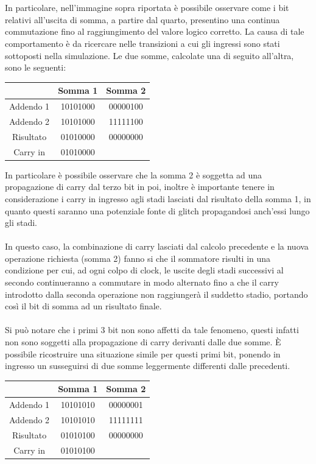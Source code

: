 \documentclass[11pt,  english, makeidx, a4paper, titlepage, oneside]{book}
\begin{document}
\\\\
In particolare, nell'immagine sopra riportata è possibile osservare come i bit relativi all'uscita di somma, a partire dal
quarto, presentino una continua commutazione fino al raggiungimento del valore logico corretto. La causa di tale comportamento è da ricercare
nelle transizioni a cui gli ingressi sono stati sottoposti nella simulazione. Le due somme, calcolate una di seguito all'altra,
sono le seguenti:
\vspace{0.3cm}
\begin{center}
\begin{tabular}{|c|c|c|}
\hline
& Somma 1 & Somma 2 \\
\hline
Addendo 1 & 10101000 & 00000100\\
\hline
Addendo 2 & 10101000 & 11111100\\
\hline
Risultato & 01010000 & 00000000\\
\hline
Carry in & 01010000 & \\
\hline
\end{tabular}
\end{center}
\vspace{0.3cm}
In particolare è possibile osservare che la somma 2 è soggetta ad una propagazione di carry dal terzo bit in poi, inoltre è importante tenere
in considerazione i carry in ingresso agli stadi lasciati dal risultato della somma 1, in quanto questi saranno una potenziale fonte di glitch propagandosi anch'essi lungo gli stadi. \\\\
In questo caso, la combinazione di carry lasciati dal calcolo precedente e la nuova operazione richiesta (somma 2) fanno si che il sommatore risulti in una condizione per cui, ad ogni colpo di clock, le uscite degli stadi successivi al secondo continueranno a commutare in modo alternato fino a che il carry introdotto dalla seconda operazione non raggiungerà il suddetto stadio, portando così
il bit di somma ad un risultato finale. 
\\\\
Si può notare che i primi 3 bit non sono affetti da tale fenomeno, questi infatti non sono soggetti alla propagazione di carry derivanti dalle due somme. È possibile ricostruire una situazione simile per questi primi bit, ponendo in ingresso un susseguirsi di due
somme leggermente differenti dalle precedenti.
\vspace{0.3cm}
\begin{center}
\begin{tabular}{|c|c|c|}
\hline
& Somma 1 & Somma 2 \\
\hline
Addendo 1 & 10101010 & 00000001\\
\hline
Addendo 2 & 10101010 & 11111111\\
\hline
Risultato & 01010100 & 00000000\\
\hline
Carry in & 01010100 & \\
\hline
\end{tabular}
\end{center}
\end{document}
